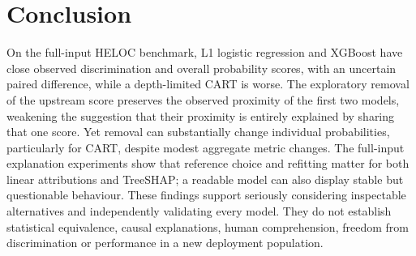 \documentclass[11pt,a4paper]{article}
\begin{document}
\section{Conclusion}
On the full-input HELOC benchmark, L1 logistic regression and XGBoost have close observed discrimination and overall probability scores, with an uncertain paired difference, while a depth-limited CART is worse. The exploratory removal of the upstream score preserves the observed proximity of the first two models, weakening the suggestion that their proximity is entirely explained by sharing that one score. Yet removal can substantially change individual probabilities, particularly for CART, despite modest aggregate metric changes. The full-input explanation experiments show that reference choice and refitting matter for both linear attributions and TreeSHAP; a readable model can also display stable but questionable behaviour. These findings support seriously considering inspectable alternatives and independently validating every model. They do not establish statistical equivalence, causal explanations, human comprehension, freedom from discrimination or performance in a new deployment population.

\FloatBarrier
\appendix

\FloatBarrier
{\footnotesize


}
\end{document}
